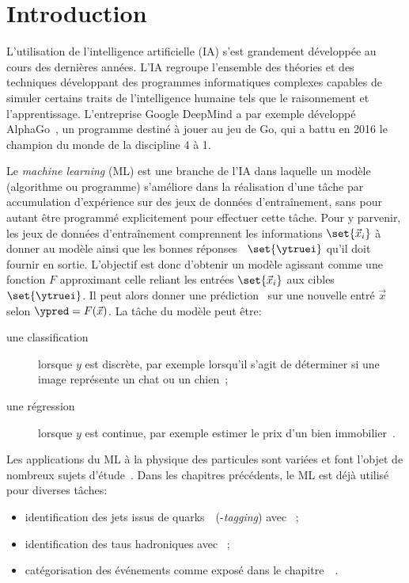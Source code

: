 \section{Introduction}\label{chapter-ML-section-intro}
L'utilisation de l'intelligence artificielle (IA) s'est grandement développée au cours des dernières années.
L'IA regroupe l'ensemble des théories et des techniques développant des programmes informatiques complexes capables de simuler certains traits de l'intelligence humaine tels que le raisonnement et l'apprentissage.
L'entreprise Google DeepMind a par exemple développé AlphaGo~\cite{alphago},
un programme destiné à jouer au jeu de Go,
qui a battu en 2016 le champion du monde de la discipline 4 à 1.
\par
Le \emph{machine learning} (ML) est une branche de l'IA
dans laquelle un modèle (algorithme ou programme) s'améliore dans la réalisation d'une tâche par
accumulation d'expérience sur des jeux de données d'entraînement,
sans pour autant être programmé explicitement pour effectuer cette tâche.
Pour y parvenir,
les jeux de données d'entraînement comprennent les informations $\set{\vec{x}_i}$ à donner au modèle
ainsi que les \og bonnes réponses \fg\ $\set{\ytruei}$ qu'il doit fournir en sortie.
L'objectif est donc d'obtenir un modèle agissant comme une fonction $F$ approximant celle reliant les entrées $\set{\vec{x}_i}$ aux cibles $\set{\ytruei}$.
Il peut alors donner une prédiction \ypred\ sur une nouvelle entré $\vec{x}$ selon $\ypred=F(\vec{x})$.
La tâche du modèle peut être:
\begin{description}
\item[une classification] lorsque $y$ est discrète, par exemple lorsqu'il s'agit de déterminer si une image représente un chat ou un chien~\cite{datafrog_img_reco};
\item[une régression] lorsque $y$ est continue, par exemple estimer le prix d'un bien immobilier~\cite{house_prices_regression}.
\end{description}
\par
Les applications du ML à la physique des particules sont variées et font l'objet de nombreux sujets d'étude~\cite{Gael_thesis,scham_moritz_2020_21993,kopf_tanja_2019_21500,Baldi_2015}.
Dans les chapitres précédents, le ML est déjà utilisé pour diverses tâches:
\begin{itemize}
\item identification des jets issus de quarks~\quarkb\ (\quarkb-\emph{tagging}) avec \DeepCSV~\cite{jet_flavor_deep_nn,Sirunyan_heavy_flavor_jets_2018,DeepJet};
\item identification des taus hadroniques avec \DEEPTAU~\cite{CMS-DP-2019-033};
\item catégorisation des événements comme exposé dans le chapitre~~\cite{CMS-NOTE-2019-177,CMS-NOTE-2019-178}.
\end{itemize}
